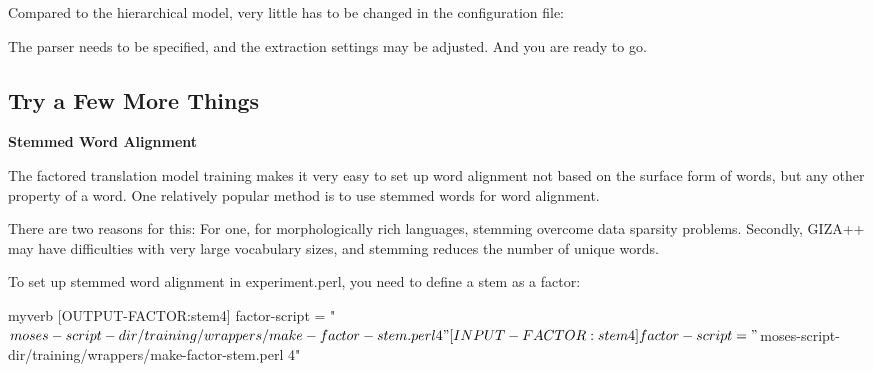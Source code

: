 Compared to the hierarchical model, very little has to be changed in the configuration file:






\colorbox{gray}{%
}

The parser needs to be specified, and the extraction settings may be adjusted. And you are ready to go.



\subsection{
\label{experiment-perl.texntoc9}Try a Few More Things}


\vspace{2mm}

{\bf 
\label{experiment-perl.texntoc10}Stemmed Word Alignment}


The factored translation model training makes it very easy to set up word alignment not based on the surface form of words, but any other property of a word. One relatively popular method is to use stemmed words for word alignment.



There are two reasons for this: For one, for morphologically rich languages, stemming overcome data sparsity problems. Secondly, GIZA++ may have difficulties with very large vocabulary sizes, and stemming reduces the number of unique words.



To set up stemmed word alignment in experiment.perl, you need to define a stem as a factor:






\begin{SaveVerbatim}{myverb}
 [OUTPUT-FACTOR:stem4]
 factor-script = "$moses-script-dir/training/wrappers/make-factor-stem.perl 4"

 [INPUT-FACTOR:stem4]
 factor-script = "$moses-script-dir/training/wrappers/make-factor-stem.perl 4"
\end{SaveVerbatim}
\colorbox{gray}{%
}

